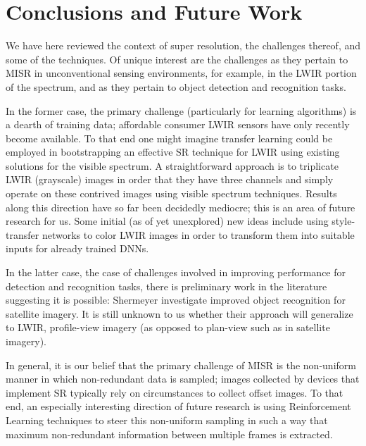 \section{Conclusions and Future Work}\label{sec:conclusions}

We have here reviewed the context of super resolution, the challenges thereof, and some of the techniques.
%
Of unique interest are the challenges as they pertain to MISR in unconventional sensing environments, for example, in the LWIR portion of the spectrum, and as they pertain to object detection and recognition tasks.

In the former case, the primary challenge (particularly for learning algorithms) is a dearth of training data; affordable consumer LWIR sensors have only recently become available.
%
To that end one might imagine transfer learning could be employed in bootstrapping an effective SR technique for LWIR using existing solutions for the visible spectrum.
%
A straightforward approach is to triplicate LWIR (grayscale) images in order that they have three channels and simply operate on these contrived images using visible spectrum techniques.
%
Results along this direction have so far been decidedly mediocre; this is an area of future research for us.
%
Some initial (as of yet unexplored) new ideas include using style-transfer networks to color LWIR images in order to transform them into suitable inputs for already trained DNNs.

In the latter case, the case of challenges involved in improving performance for detection and recognition tasks, there is preliminary work in the literature suggesting it is possible: Shermeyer \etal \cite{effectssuperres} investigate improved object recognition for satellite imagery. It is still unknown to us whether their approach will generalize to LWIR, profile-view imagery (as opposed to plan-view such as in satellite imagery).

In general, it is our belief that the primary challenge of MISR is the non-uniform manner in which non-redundant data is sampled; images collected by devices that implement SR typically rely on circumstances to collect offset images. To that end, an especially interesting direction of future research is using Reinforcement Learning techniques to steer this non-uniform sampling in such a way that maximum non-redundant information between multiple frames is extracted.